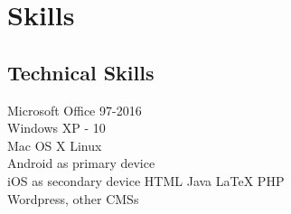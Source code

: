 \documentclass[]{deedy-resume-openfont}
\begin{document}
\begin{minipage}[t]{0.24\textwidth}
\sectionsep


\section{Skills}
\subsection{Technical Skills}
\textbullet Microsoft Office 97-2016\\
\textbullet Windows XP - 10\\
\textbullet Mac OS X
\textbullet Linux \\
\textbullet Android as primary device \\
\textbullet iOS as secondary device
\textbullet HTML
\textbullet Java
\textbullet \LaTeX
\textbullet PHP \\
\textbullet Wordpress, other CMSs  \\

\sectionsep

%
%

\end{minipage} 
\hfill
\end{document}
